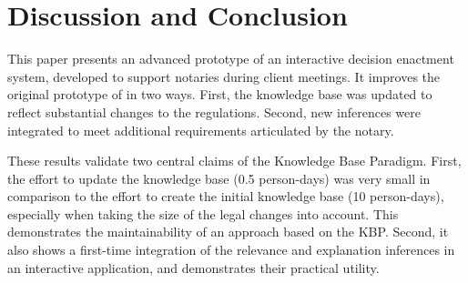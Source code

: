 \section{Discussion and Conclusion}
\label{conclusion}

This paper presents an advanced prototype of an interactive decision enactment system, developed to support notaries during client meetings.
It improves the original prototype of \cite{ruleml/DeryckHVV18} in two ways.  First, the knowledge base was updated to reflect  substantial changes to the regulations. %
Second, new inferences were integrated to meet additional requirements articulated by the notary.

These results validate two central claims of the Knowledge Base Paradigm.
First, the effort to update the knowledge base (0.5 person-days) was very small in comparison to the effort to create the initial knowledge base (10 person-days), especially when taking the size of the legal changes into account. This demonstrates the maintainability of an approach based on the KBP. %
Second, it also shows a first-time integration of the relevance and explanation inferences in an interactive application, and demonstrates their practical utility.  
